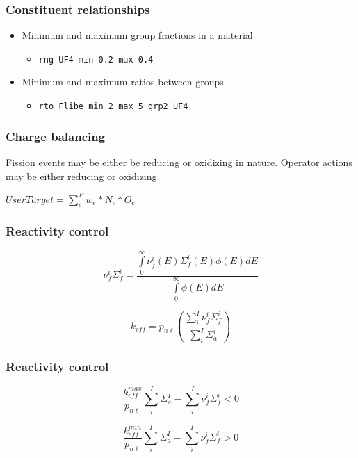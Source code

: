 \documentclass{beamer}
\begin{document}
\begin{frame}
\frametitle{Constituent relationships}

    \begin{itemize}
        \item Minimum and maximum group fractions in a material
            \begin{itemize}
                \item \texttt{rng UF4 min 0.2 max 0.4}
            \end{itemize}
        \hspace{2cm}
        \item Minimum and maximum ratios between groups
            \begin{itemize}
                \item \texttt{rto Flibe min 2 max 5 grp2 UF4}
            \end{itemize}
    \end{itemize}

\end{frame}

\begin{frame}
\frametitle{Charge balancing}

Fission events may be either be reducing or oxidizing in nature. Operator
actions may be either reducing or oxidizing.

\hspace{2cm}

$UserTarget = \sum\limits_{e}^{E}w_{e}*N_{e}*O_{e}$

\end{frame}

\begin{frame}
\frametitle{Reactivity control}

    \begin{equation}
    \label{nufis}
        \nu_{f}^{i}\Sigma_{f}^{i} = \frac{\int\limits_{0}^{\infty}\nu_{f}^{i}(E)\Sigma_{f}^{i}(E)\phi(E)dE}{\int\limits_{0}^{\infty}\phi(E)dE}
    \end{equation}

    \begin{equation}
    \label{reactivity_sum}
        k_{eff} = p_{n\ell}\left(\frac{\sum\limits_{i}^{I}\nu_{f}^{i}\Sigma_{f}^{i}}{\sum\limits_{i}^{I}\Sigma_{a}^{i}}\right)
    \end{equation}

\end{frame}

\begin{frame}
\frametitle{Reactivity control}

    \begin{equation}
    \label{max_reac}
        \frac{k_{eff}^{max}}{p_{n\ell}}\sum\limits_{i}^{I}\Sigma_{a}^{I} - \sum\limits_{i}^{I}\nu_{f}^{i}\Sigma_{f}^{i} < 0
    \end{equation}

    \begin{equation}
    \label{max_reac}
        \frac{k_{eff}^{min}}{p_{n\ell}}\sum\limits_{i}^{I}\Sigma_{a}^{I} - \sum\limits_{i}^{I}\nu_{f}^{i}\Sigma_{f}^{i} > 0   
    \end{equation}

\end{frame}
\end{document}
